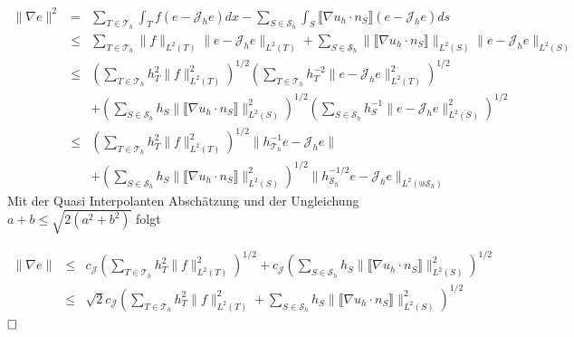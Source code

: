 \begin{eqnarray*}
	\|\nabla e\|^2 &=&  \sum_{T\in\mathscr{T}_h} \int_{T} f (e-\mathscr{J}_he)dx - \sum_{S\in\mathscr{S}_h} \int_{S} \llbracket \nabla u_h \cdot n_S\rrbracket (e-\mathscr{J}_he) ds \\
	&\leq&  \sum_{T\in\mathscr{T}_h}\|f\|_{L^2(T)} \|e-\mathscr{J}_he\|_{L^2(T)} + \sum_{S\in\mathscr{S}_h} \|\llbracket \nabla u_h \cdot n_S\rrbracket\|_{L^2(S)} \|e-\mathscr{J}_he\|_{L^2(S)}\\
	&\leq& \left( \sum_{T\in\mathscr{T}_h}h_T^2\|f\|_{L^2(T)}^2\right)^{1/2}\left( \sum_{T\in\mathscr{T}_h}h_T^{-2}\|e-\mathscr{J}_he\|_{L^2(T)}^2\right)^{1/2} \\
	&&+ \left(\sum_{S\in\mathscr{S}_h} h_S\|\llbracket \nabla u_h \cdot n_S\rrbracket\|_{L^2(S)}^2\right)^{1/2} \left(\sum_{S\in\mathscr{S}_h}h_S^{-1}\|e-\mathscr{J}_he\|_{L^2(S)}^2\right)^{1/2}\\
	&\leq& \left( \sum_{T\in\mathscr{T}_h}h_T^2\|f\|_{L^2(T)}^2\right)^{1/2}\|h_{\mathscr{T}_h}^{-1}e-\mathscr{J}_he\| \\
	&&+ \left(\sum_{S\in\mathscr{S}_h} h_S\|\llbracket \nabla u_h \cdot n_S\rrbracket\|_{L^2(S)}^2\right)^{1/2} \|h_{\mathscr{S}_h}^{-1/2}e-\mathscr{J}_he\|_{L^2(\Cup \mathscr{S}_h)}
\end{eqnarray*}
Mit der Quasi Interpolanten Abschätzung und der Ungleichung $a+b\leq \sqrt{2(a^2+b^2)}$ folgt

\begin{eqnarray*}
 \|\nabla e\| &\leq& c_{\mathscr{J}}\left( \sum_{T\in\mathscr{T}_h}h_T^2\|f\|_{L^2(T)}^2\right)^{1/2}
+ c_{\mathscr{J}}\left(\sum_{S\in\mathscr{S}_h} h_S\|\llbracket \nabla u_h \cdot n_S\rrbracket\|_{L^2(S)}^2\right)^{1/2} \\
 &\leq& \sqrt{2}c_{\mathscr{J}}\left( \sum_{T\in\mathscr{T}_h}h_T^2\|f\|_{L^2(T)}^2
 + \sum_{S\in\mathscr{S}_h} h_S\|\llbracket \nabla u_h \cdot n_S\rrbracket\|_{L^2(S)}^2\right)^{1/2}
\end{eqnarray*}
$\hfill \Box$
